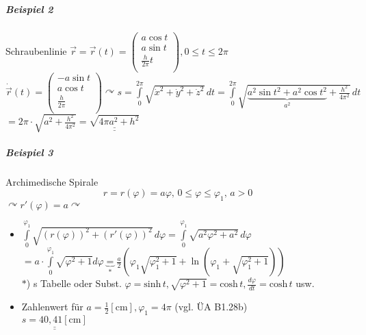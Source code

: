 \documentclass[a4paper]{scrartcl}
\begin{document}
\subparagraph{Beispiel 2} Schraubenlinie $\vec{r} = \vec{r} (t) = \begin{pmatrix} a \cos{t} \\ a \sin{t} \\ \frac{h}{2\pi} t\\ \end{pmatrix}, 0 \leq t \leq 2\pi$\\
$\dot{\vec{r}}(t) = \begin{pmatrix} - a \sin{t} \\ a \cos{t} \\ \frac{h}{2\pi} \\ \end{pmatrix} \curvearrowright s = \int\limits_{0}^{2\pi} \sqrt{\dot{x}^2 + \dot{y}^2 + \dot{z}^2 } \, dt = \int\limits_0^{2\pi} \sqrt{ \underbrace{a^2 \sin{t}^2 + a^2 \cos{t}^2 }_{a^2} + \frac{h^2}{4 \pi^2} } \, dt$\\
$=2 \pi \cdot \sqrt{a^2 + \frac{h^2}{4 \pi^2} } = \underline{\underline{\sqrt{4 \pi a^2 + h^2}}}$

\subparagraph{Beispiel 3} Archimedische Spirale
\[ r = r(\varphi) = a \varphi, \, 0 \leq \varphi \leq \varphi_1 , \, a > 0 \]
$\curvearrowright r'(\varphi) = a \curvearrowright$\\
\begin{itemize}
\item $\int\limits_{0}^{\varphi_1} \sqrt{(r(\varphi))^2 + (r' ( \varphi))^2 } \, d\varphi = \int\limits_{0}^{\varphi_1} \sqrt{a^2\varphi^2 + a^2} \, d\varphi$\\
$= a \cdot \int\limits_{0}^{\varphi_1} \sqrt{\varphi^2 +1} d\varphi \underbrace{=}_{*} \frac{a}{2} \left ( \varphi_1 \sqrt{\varphi_1^2 +1} + \ln{(\varphi_1 + \sqrt{\varphi_1^2 +1})} \right )$\\
$*$) s Tabelle oder Subst. $\varphi = \text{sinh} \, t, \sqrt{\varphi^2 +1 } = \text{cosh} \, t , \frac{d\varphi}{dt} = \text{cosh} \, t$ usw.
\item Zahlenwert für $a= \frac{1}{2} [\text{cm}] , \varphi_1 = 4\pi $ (vgl. ÜA B1.28b)\\
$\underline{\underline{s= 40,41 [\text{cm}] }}$
\end{itemize}
\end{document}

